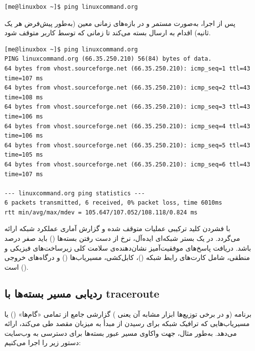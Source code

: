 \begin{latin}
\begin{lstlisting}
[me@linuxbox ~]$ ping linuxcommand.org
\end{lstlisting}
\end{latin}

پس از اجرا،  به‌صورت مستمر و در بازه‌های زمانی معین (به‌طور پیش‌فرض هر یک ثانیه) اقدام به ارسال بسته می‌کند تا زمانی که توسط کاربر متوقف شود.

\begin{latin}
\begin{lstlisting}
[me@linuxbox ~]$ ping linuxcommand.org
PING linuxcommand.org (66.35.250.210) 56(84) bytes of data.
64 bytes from vhost.sourceforge.net (66.35.250.210): icmp_seq=1 ttl=43 time=107 ms
64 bytes from vhost.sourceforge.net (66.35.250.210): icmp_seq=2 ttl=43 time=108 ms
64 bytes from vhost.sourceforge.net (66.35.250.210): icmp_seq=3 ttl=43 time=106 ms
64 bytes from vhost.sourceforge.net (66.35.250.210): icmp_seq=4 ttl=43 time=106 ms
64 bytes from vhost.sourceforge.net (66.35.250.210): icmp_seq=5 ttl=43 time=105 ms
64 bytes from vhost.sourceforge.net (66.35.250.210): icmp_seq=6 ttl=43 time=107 ms

--- linuxcommand.org ping statistics ---
6 packets transmitted, 6 received, 0% packet loss, time 6010ms
rtt min/avg/max/mdev = 105.647/107.052/108.118/0.824 ms
\end{lstlisting}
\end{latin}

با فشردن کلید ترکیبی  عملیات متوقف شده و گزارش آماری عملکرد شبکه ارائه می‌گردد. در یک بستر شبکه‌ای ایده‌آل، نرخ از دست رفتن بسته‌ها () باید صفر درصد باشد. دریافت پاسخ‌های موفقیت‌آمیز نشان‌دهنده‌ی سلامت کلی زیرساخت‌های فیزیکی و منطقی، شامل کارت‌های رابط شبکه ()، کابل‌کشی، مسیریاب‌ها () و درگاه‌های خروجی () است.

\subsection{ردیابی مسیر بسته‌ها با traceroute}

برنامه  (و در برخی توزیع‌ها ابزار مشابه آن یعنی ) گزارشی جامع از تمامی «گام‌ها» () یا مسیریاب‌هایی که ترافیک شبکه برای رسیدن از مبدأ به میزبان مقصد طی می‌کند، ارائه می‌دهد. به‌طور مثال، جهت واکاوی مسیر عبور بسته‌ها برای دسترسی به وب‌سایت  دستور زیر را اجرا می‌کنیم:

